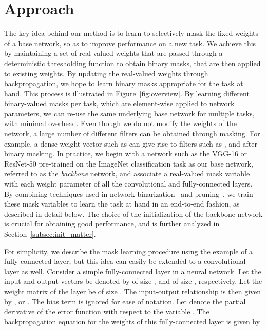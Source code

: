 \documentclass{llncs}
\begin{document}
%
 

\section{Approach}
\label{sec:approach}

The key idea behind our method is to learn to selectively mask the fixed weights of a base network, so as to improve performance on a new task. We achieve this by maintaining a set of real-valued weights that are passed through a deterministic thresholding function to obtain binary masks, that are then applied to existing weights. By updating the real-valued weights through backpropagation, we hope to learn binary masks appropriate for the task at hand. This process is illustrated in Figure~\ref{fig:overview}.
By learning different binary-valued  masks per task, which are element-wise applied to network parameters, we can re-use the same underlying base network for multiple tasks, with minimal overhead.
Even though we do not modify the weights of the network, a large number of different filters can be obtained through masking. For example, a dense weight vector such as  can give rise to filters such as  , and   after binary masking. 
In practice, we begin with a network such as the VGG-16 or ResNet-50 pre-trained on the ImageNet classification task as our base network, referred to as the \emph{backbone} network, and associate a real-valued mask variable with each weight parameter of all the convolutional and fully-connected layers. By combining techniques used in network binarization~\cite{courbariaux2015binaryconnect,hubara2016binarized} and pruning~\cite{guo2016dynamic}, we train these mask variables to learn the task at hand in an end-to-end fashion, as described in detail below.
The choice of the initialization of the backbone network is crucial for obtaining good performance, and is further analyzed in Section~\ref{subsec:init_matter}.

For simplicity, we describe the mask learning procedure using the example of a fully-connected layer, but this idea can easily be extended to a convolutional layer as well.
Consider a simple fully-connected layer in a neural network. 
Let the input and output vectors be denoted by  of size , and  of size , respectively. Let the weight matrix of the layer be  of size . The input-output relationship is then given by , or . 
The bias term is ignored for ease of notation.
Let  denote the partial derivative of the error function  with respect to the variable .
The backpropagation equation for the weights  of this fully-connected layer is given by
\vspace{-4pt}
\end{document}
